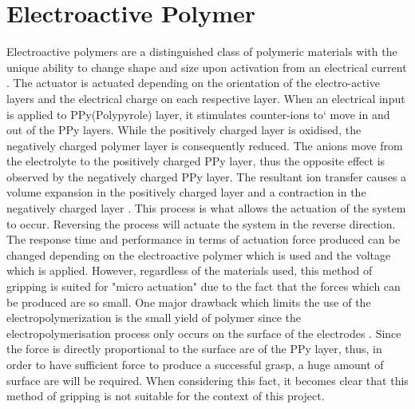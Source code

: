 \documentclass[11pt,twocolumn]{article}
\begin{document}
\section{Electroactive Polymer}
Electroactive polymers are a distinguished class of polymeric materials with the unique ability to change shape and size upon activation from an electrical current \cite{pillay2014review}. The actuator is actuated depending on the orientation of the electro-active layers and the electrical charge on each respective layer. When an electrical input is applied to PPy(Polypyrole) layer, it stimulates counter-ions to` move in and out of the PPy layers. While the positively charged layer is oxidised, the negatively charged polymer layer is consequently reduced. The anions move from the electrolyte to the positively charged PPy layer, thus the opposite effect is observed by the negatively charged PPy layer. The resultant ion transfer causes a volume expansion in the positively charged layer and a contraction in the negatively charged layer \cite{mutlu2013electroactive}. This process is what allows the actuation of the system to occur. Reversing the process will actuate the system in the reverse direction.
\\
\newline
The response time and performance in terms of actuation force produced can be changed depending on the electroactive polymer which is used and the voltage which is applied. However, regardless of the materials used, this method of gripping is suited for "micro actuation" due to the fact that the forces which can be produced are so small\cite{bogue2016flexible}. One major drawback which limits the use of the electropolymerization is the small yield of polymer since the electropolymerisation process only occurs on the surface of the electrodes \cite{pillay2014review}. Since the force is directly proportional to the surface are of the PPy layer, thus, in order to have sufficient force to produce a successful grasp, a huge amount of surface are will be required. When considering this fact, it becomes clear that this method of gripping is not suitable for the context of this project.
\end{document}
